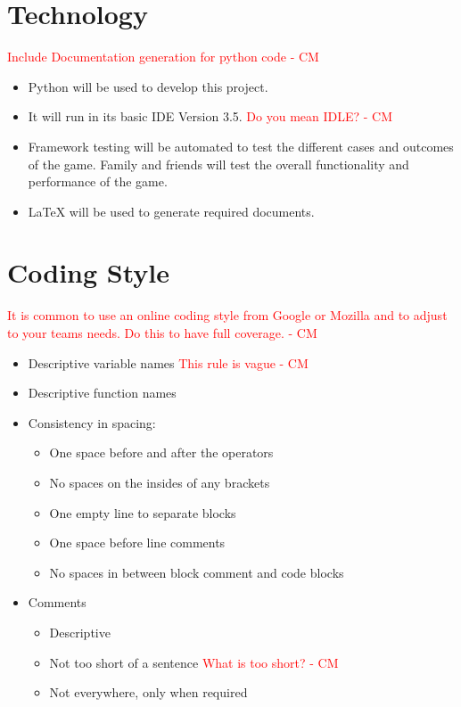 \documentclass{article}
\begin{document}
\section{Technology}
\textcolor{red}{Include Documentation generation for python code  - CM} \\
\begin{itemize}
\item Python will be used to develop this project.
\item It will run in its basic IDE Version 3.5. \textcolor{red}{Do you mean IDLE? - CM} \\
\item Framework testing will be automated to test the different cases and outcomes of the game. Family and friends will test the overall functionality and performance of the game.
\item LaTeX will be used to generate required documents.
\end{itemize}
\section{Coding Style}
\textcolor{red}{ It is common to use an online coding style from Google or Mozilla and to adjust to your teams needs. Do this to have full coverage.  - CM} \\
\begin{itemize}
\item Descriptive variable names \textcolor{red}{ This rule is vague - CM} \\
\item Descriptive function names
\item Consistency in spacing:
\begin{itemize}
\item One space before and after the operators
\item No spaces on the insides of any brackets
\item One empty line to separate blocks
\item One space before line comments
\item No spaces in between block comment and code blocks
\end{itemize}
\item Comments
\begin{itemize}
\item Descriptive
\item Not too short of a sentence \textcolor{red}{What is too short? - CM} \\
\item Not everywhere, only when required 
\end{itemize}
\end{itemize}
\end{document}
